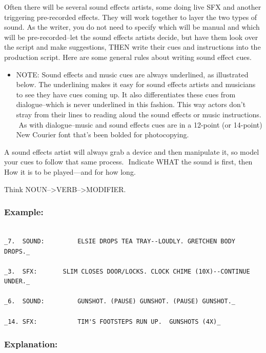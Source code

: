 \documentclass[openleft,oneside,showtrims]{memoir}
\begin{document}
Often there will be several sound effects artists, some doing live SFX and another triggering pre-recorded effects. They will work together to layer the two types of sound. As the writer, you do not need to specify which will be manual and which will be pre-recorded--let the sound effects artists decide, but have them look over the script and make suggestions, THEN write their cues and instructions into the production script. Here are some general rules about writing sound effect cues. 

\begin{itemize}
\item NOTE: Sound effects and music cues are always underlined, as illustrated below. The underlining makes it easy for sound effects artists and musicians to see they have cues coming up. It also differentiates these cues from dialogue--which is never underlined in this fashion. This way actors don't stray from their lines to reading aloud the sound effects or music instructions.  As with dialogue--music and sound effects cues are in a 12-point (or 14-point) New Courier font that's been bolded for photocopying.
\end{itemize}

A sound effects artist will always grab a device and then manipulate it, so model your cues to follow that same process.  Indicate WHAT the sound is first, then How it is to be played---and for how long. 

Think NOUN-->VERB-->MODIFIER.

\subsubsection*{Example:}
\label{sec:orge9979e6}

\begin{verbatim}

_7.  SOUND:         ELSIE DROPS TEA TRAY--LOUDLY. GRETCHEN BODY DROPS._

_3.  SFX: 	    SLIM CLOSES DOOR/LOCKS. CLOCK CHIME (10X)--CONTINUE UNDER._

_6.  SOUND:         GUNSHOT. (PAUSE) GUNSHOT. (PAUSE) GUNSHOT._

_14. SFX:           TIM'S FOOTSTEPS RUN UP.  GUNSHOTS (4X)_

\end{verbatim}

\subsubsection*{Explanation:}
\label{sec:orgd14cdef}
\end{document}

